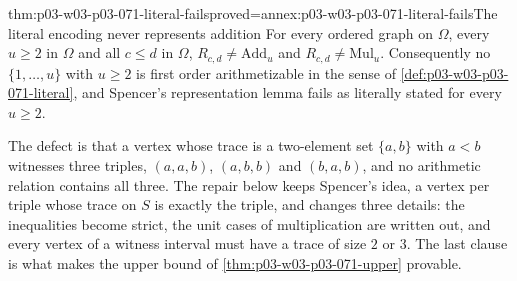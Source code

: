 \begin{hbtheorem}{thm:p03-w03-p03-071-literal-fails}{proved=annex:p03-w03-p03-071-literal-fails}{The literal encoding never represents addition}
For every ordered graph on \(\Omega\), every \(u\geq2\) in \(\Omega\) and
all \(c\leq d\) in \(\Omega\), \(R_{c,d}\neq\mathrm{Add}_u\) and
\(R_{c,d}\neq\mathrm{Mul}_u\).  Consequently no \(\{1,\ldots,u\}\) with
\(u\geq2\) is first order arithmetizable in the sense of
\cref{def:p03-w03-p03-071-literal}, and Spencer's representation lemma
\cite[p.~23]{Spencer2007LogicRandomStructuresAuthor} fails as literally
stated for every \(u\geq2\).
\end{hbtheorem}

The defect is that a vertex whose trace is a two-element set
\(\{a,b\}\) with \(a<b\) witnesses three triples, \((a,a,b)\), \((a,b,b)\) and
\((b,a,b)\), and no arithmetic relation contains all three.  The repair below
keeps Spencer's idea, a vertex per triple whose trace on \(S\) is exactly
the triple, and changes three details: the inequalities become strict, the
unit cases of multiplication are written out, and every vertex of a witness
interval must have a trace of size \(2\) or \(3\).  The last clause is what
makes the upper bound of \cref{thm:p03-w03-p03-071-upper} provable.

